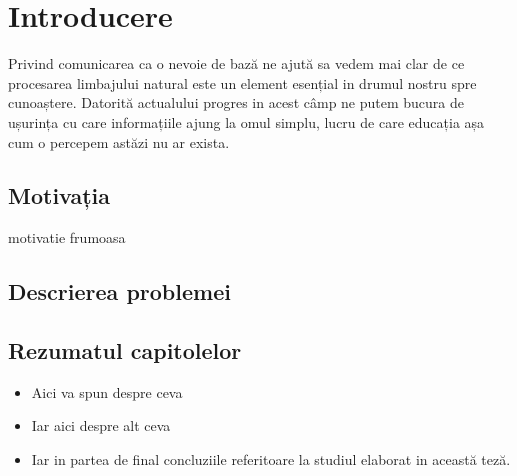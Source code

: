 \chapter{Introducere}

Privind comunicarea ca o nevoie de bază ne ajută sa vedem mai clar de ce procesarea limbajului natural este un element esențial in drumul nostru spre cunoaștere. Datorită actualului progres in acest câmp ne putem bucura de ușurința cu care informațiile ajung la omul simplu, lucru de care educația așa cum o percepem astăzi nu ar exista.


\section{Motivația}

motivatie frumoasa


\section{Descrierea problemei}


	
\section{Rezumatul capitolelor}

\begin{itemize}
	\item 
	Aici va spun despre ceva
	\item
	Iar aici despre alt ceva
	\item
	Iar in partea de final concluziile referitoare la studiul elaborat in această teză.
	
\end{itemize}


